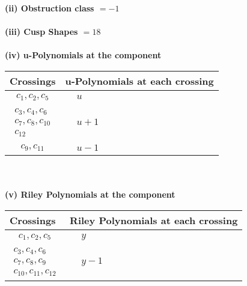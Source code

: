 \documentclass[1p]{elsarticle_modified}
\theoremstyle{definition}
\begin{document}
\flushleft \textbf{(ii) Obstruction class $= -1$}\\~\\
\flushleft \textbf{(iii) Cusp Shapes $= 18$}\\~\\
\newpage\renewcommand{\arraystretch}{1}
\flushleft \textbf{(iv) u-Polynomials at the component}\newline \\
\begin{tabular}{m{50pt}|m{274pt}}
Crossings & \hspace{64pt}u-Polynomials at each crossing \\
\hline $$\begin{aligned}c_{1},c_{2},c_{5}\end{aligned}$$&$\begin{aligned}
&u
\end{aligned}$\\
\hline $$\begin{aligned}c_{3},c_{4},c_{6}\\c_{7},c_{8},c_{10}\\c_{12}\end{aligned}$$&$\begin{aligned}
&u+1
\end{aligned}$\\
\hline $$\begin{aligned}c_{9},c_{11}\end{aligned}$$&$\begin{aligned}
&u-1
\end{aligned}$\\
\hline
\end{tabular}\\~\\
\newpage\renewcommand{\arraystretch}{1}
\flushleft \textbf{(v) Riley Polynomials at the component}\newline \\
\begin{tabular}{m{50pt}|m{274pt}}
Crossings & \hspace{64pt}Riley Polynomials at each crossing \\
\hline $$\begin{aligned}c_{1},c_{2},c_{5}\end{aligned}$$&$\begin{aligned}
&y
\end{aligned}$\\
\hline $$\begin{aligned}c_{3},c_{4},c_{6}\\c_{7},c_{8},c_{9}\\c_{10},c_{11},c_{12}\end{aligned}$$&$\begin{aligned}
&y-1
\end{aligned}$\\
\hline
\end{tabular}\\~\\
\end{document}
